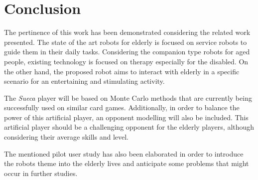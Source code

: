 \section{Conclusion} \label{sec:conclusion}

The pertinence of this work has been demonstrated considering the related work presented.
The state of the art robots for elderly is focused on service robots to guide them in their daily tasks.
Considering the companion type robots for aged people, existing technology is focused on therapy especially for the disabled.
On the other hand, the proposed robot aims to interact with elderly in a specific scenario for an entertaining and stimulating activity.

The \emph{Sueca} player will be based on Monte Carlo methods that are currently being successfully used on similar card games.
Additionally, in order to balance the power of this artificial player, an opponent modelling will also be included.
This artificial player should be a challenging opponent for the elderly players, although considering their average skills and level.

The mentioned pilot user study has also been elaborated in order to introduce the robots theme into the elderly lives and anticipate some problems that might occur in further studies.

